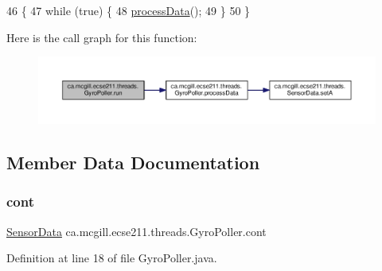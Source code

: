 \begin{DoxyCode}
46                     \{
47     \textcolor{keywordflow}{while} (\textcolor{keyword}{true}) \{
48       \hyperlink{classca_1_1mcgill_1_1ecse211_1_1threads_1_1_gyro_poller_a27f914ed77f23805210998fc0ee2daa7}{processData}();
49     \}
50   \}
\end{DoxyCode}
Here is the call graph for this function\+:\nopagebreak
\begin{figure}[H]
\begin{center}
\leavevmode
\includegraphics[width=350pt]{classca_1_1mcgill_1_1ecse211_1_1threads_1_1_gyro_poller_a7a3232e355cece714fa85a3a902d9cfd_cgraph}
\end{center}
\end{figure}


\subsection{Member Data Documentation}
\mbox{\label{classca_1_1mcgill_1_1ecse211_1_1threads_1_1_gyro_poller_a90507a3d6038ff7ec7881640b5dd4263}} 
\subsubsection{\texorpdfstring{cont}{cont}}
{\footnotesize\ttfamily \hyperlink{classca_1_1mcgill_1_1ecse211_1_1threads_1_1_sensor_data}{Sensor\+Data} ca.\+mcgill.\+ecse211.\+threads.\+Gyro\+Poller.\+cont\hspace{0.3cm}{\ttfamily [protected]}}



Definition at line 18 of file Gyro\+Poller.\+java.

\mbox{\label{classca_1_1mcgill_1_1ecse211_1_1threads_1_1_gyro_poller_a181979440aafff52b0ba5aaff9064f80}} 
